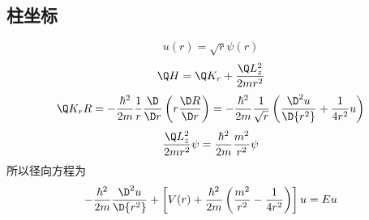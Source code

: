 \subsection{柱坐标}
 \begin{equation}
  u(r) = \sqrt r \psi (r)
\end{equation}
 \begin{equation}
  \Q H = {\Q K_r} + \frac{\Q L_z^2}{2m{r^2}}
\end{equation}
 \begin{equation}
  {\Q K_r}R =  - \frac{\hbar ^2}{2m}\frac{1}{r}\frac{\D }{\D r}\left( {r\frac{\D R}{\D r}} \right) =  - \frac{\hbar ^2}{2m}\frac{1}{\sqrt r }\left( {\frac{{\D ^2}u}{\D {r^2}} + \frac{1}{4{r^2}}u} \right)
\end{equation}
 \begin{equation}
  \frac{\Q L_z^2}{2m{r^2}}\psi  = \frac{\hbar ^2}{2m}\frac{m^2}{r^2}\psi 
\end{equation}
所以径向方程为
 \begin{equation}
   - \frac{\hbar ^2}{2m}\frac{{\D ^2}u}{\D {r^2}} + \left[ {V(r) + \frac{\hbar ^2}{2m}\left( {\frac{m^2}{r^2} - \frac{1}{4{r^2}}} \right)} \right]u = Eu
\end{equation}

